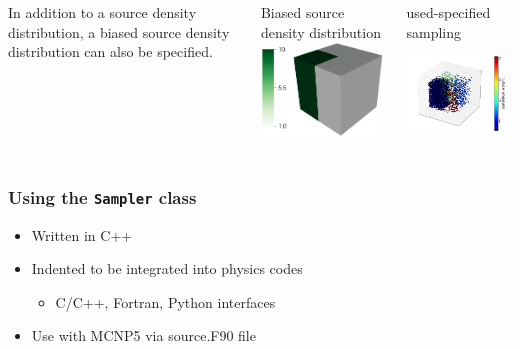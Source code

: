 \documentclass[xcolor=x11names,compress]{beamer}
\begin{document}
\begin{frame}
\begin{columns}[T]
\begin{column}{0.3\textwidth}
\vspace{0.6cm}
{\small In addition to a source density distribution, a biased source density distribution can also be specified.}
\end{column}
\begin{column}{0.3\textwidth}
\begin{block}{\tiny Biased source density distribution}
\vspace{0.2cm}
\includegraphics[height=2.5cm]{sampler_bias.png}
\end{block}
\end{column}
\begin{column}{0.3\textwidth}
\begin{block}{\tiny used-specified sampling}
\includegraphics[height=2.7cm]{sample_user.png}
\end{block}
\end{column}
\end{columns}

\end{frame}

\begin{frame}
\frametitle{Using the \texttt{Sampler} class}

\begin{itemize}
\item{Written in C++}
\item{Indented to be integrated into physics codes}
  \begin{itemize}
  \item{C/C++, Fortran, Python interfaces}
  \end{itemize}
\item{Use with MCNP5 via source.F90 file}
\end{itemize}
\end{frame}
\end{document}

